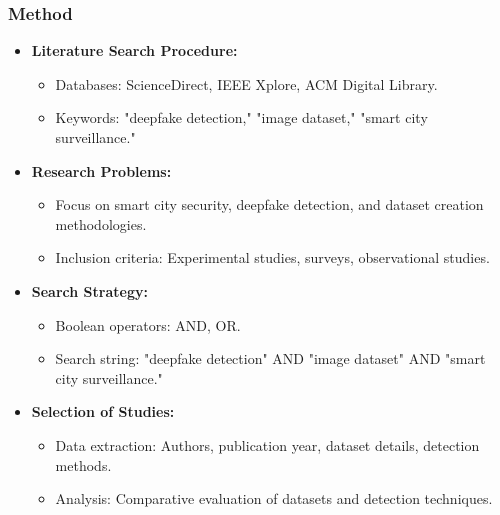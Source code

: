 \documentclass{beamer}
\begin{document}
\begin{frame}
    \frametitle{Method}
    \begin{itemize}
        \item \textbf{Literature Search Procedure:}
            \begin{itemize}
                \item Databases: ScienceDirect, IEEE Xplore, ACM Digital Library.
                \item Keywords: "deepfake detection," "image dataset," "smart city surveillance."
            \end{itemize}
        \item \textbf{Research Problems:}
            \begin{itemize}
                \item Focus on smart city security, deepfake detection, and dataset creation methodologies.
                \item Inclusion criteria: Experimental studies, surveys, observational studies.
            \end{itemize}
        \item \textbf{Search Strategy:}
            \begin{itemize}
                \item Boolean operators: AND, OR.
                \item Search string: "deepfake detection" AND "image dataset" AND "smart city surveillance."
            \end{itemize}
        \item \textbf{Selection of Studies:}
            \begin{itemize}
                \item Data extraction: Authors, publication year, dataset details, detection methods.
                \item Analysis: Comparative evaluation of datasets and detection techniques.
            \end{itemize}
    \end{itemize}
\end{frame}
\end{document}
